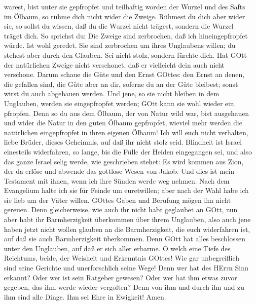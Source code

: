 warest, bist unter sie gepfropfet und teilhaftig worden der Wurzel und
des Safts im Ölbaum,  so rühme dich nicht wider die Zweige.
Rühmest du dich aber wider sie, so sollst du wissen, daß du die Wurzel
nicht trägest, sondern die Wurzel träget dich.  So sprichst
du: Die Zweige sind zerbrochen, daß ich hineingepfropfet würde.
 Ist wohl geredet. Sie sind zerbrochen um ihres Unglaubens
willen; du stehest aber durch den Glauben. Sei nicht stolz, sondern
fürchte dich.  Hat GOtt der natürlichen Zweige nicht
verschonet, daß er vielleicht dein auch nicht verschone. 
Darum schaue die Güte und den Ernst GOttes: den Ernst an denen, die
gefallen sind, die Güte aber an dir, soferne du an der Güte bleibest;
sonst wirst du auch abgehauen werden.  Und jene, so sie
nicht bleiben in dem Unglauben, werden sie eingepfropfet werden; GOtt
kann sie wohl wieder ein pfropfen.  Denn so du aus dem
Ölbaum, der von Natur wild war, bist ausgehauen und wider die Natur in
den guten Ölbaum gepfropfet, wieviel mehr werden die natürlichen
eingepfropfet in ihren eigenen Ölbaum!  Ich will euch nicht
verhalten, liebe Brüder, dieses Geheimnis, auf daß ihr nicht stolz seid.
Blindheit ist Israel einesteils widerfahren, so lange, bis die Fülle der
Heiden eingegangen sei,  und also das ganze Israel selig
werde, wie geschrieben stehet: Es wird kommen aus Zion, der da erlöse
und abwende das gottlose Wesen von Jakob.  Und dies ist
mein Testament mit ihnen, wenn ich ihre Sünden werde weg nehmen.
 Nach dem Evangelium halte ich sie für Feinde um
euretwillen; aber nach der Wahl habe ich sie lieb um der Väter willen.
 GOttes Gaben und Berufung mögen ihn nicht gereuen.
 Denn gleicherweise, wie auch ihr nicht habt geglaubet an
GOtt, nun aber habt ihr Barmherzigkeit überkommen über ihrem Unglauben,
 also auch jene haben jetzt nicht wollen glauben an die
Barmherzigkeit, die euch widerfahren ist, auf daß sie auch
Barmherzigkeit überkommen.  Denn GOtt hat alles beschlossen
unter den Unglauben, auf daß er sich aller erbarme.  O
welch eine Tiefe des Reichtums, beide, der Weisheit und Erkenntnis
GOttes! Wie gar unbegreiflich sind seine Gerichte und unerforschlich
seine Wege!  Denn wer hat des HErrn Sinn erkannt? Oder wer
ist sein Ratgeber gewesen?  Oder wer hat ihm etwas zuvor
gegeben, das ihm werde wieder vergolten?  Denn von ihm und
durch ihn und zu ihm sind alle Dinge. Ihm sei Ehre in Ewigkeit! Amen.

